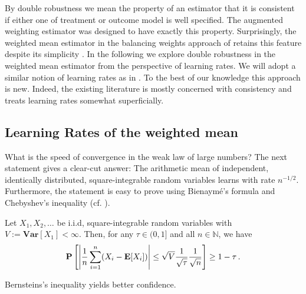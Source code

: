 
By double robustness we mean the property of an estimator that it is consistent if either one of treatment or outcome model is well specified.
The augmented weighting estimator was designed to have exactly this property.
Surprisingly, the weighted mean estimator in the balancing weights approach of \cite{Wang2019} retains this feature despite its simplicity \cite{Zhao2017a}. 
In the following we explore double robustness in the weighted mean estimator from the perspective of learning rates.
We will adopt a similar notion of learning rates as in \cite{Steinwart2008}.
To the best of our knowledge this approach is new. Indeed, the existing literature is mostly concerned with consistency and treats learning rates somewhat superficially. 
\subsection{Learning Rates of the weighted mean}

What is the speed of convergence in the weak law of large numbers?
The next statement gives a clear-cut answer:
The arithmetic mean of independent, identically distributed, square-integrable random variables 
learns with rate $n^{-1/2}$.
Furthermore, the statement is easy to prove using
Bienaymé's formula and Chebyshev's inequality (cf. \cite[Theorem~5.14]{Klenke2020}).


\begin{theorem*}
  Let 
  $
    X_1,X_2,\ldots
  $
  be i.i.d, square-integrable random variables with 
  $
    V:=
    \mathbf{Var}[X_1]
    <\infty
  $.
  Then, for any $\tau \in (0,1]$ and all $n\in\mathbb{N}$, we have
  \begin{gather}
   \mathbf{P}
   \left[
     \left| 
   \frac{1}{n}
   \sum_{i=1}^{n}
   (X_i - \mathbf{E}[X_i])
     \right|
     \le
     \sqrt{V}
     \frac{1}{\sqrt{\tau}}
     \frac{1}{\sqrt{n}}
   \right]
   \ge
   1-\tau\,.
  \end{gather}
\end{theorem*}
\begin{reflection*}
  Bernsteins's inequality yields better confidence.
\end{reflection*}

